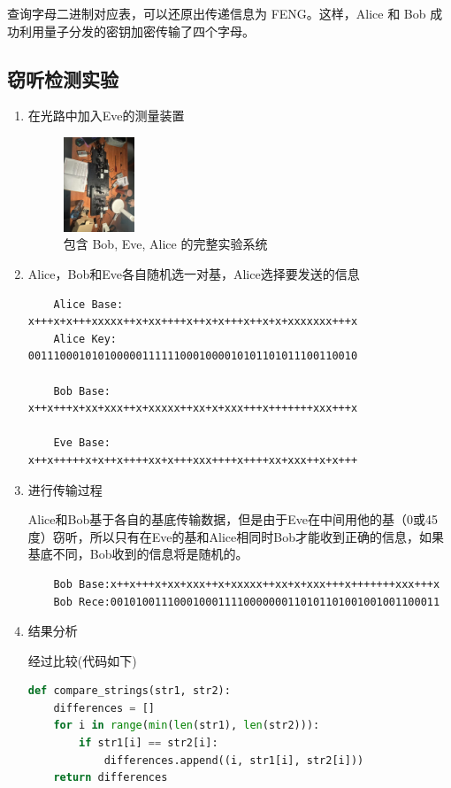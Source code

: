 \documentclass{ctexart}
\begin{document}
查询字母二进制对应表，可以还原出传递信息为 FENG。这样，Alice 和 Bob 成功利用量子分发的密钥加密传输了四个字母。

\subsection{窃听检测实验}
\begin{enumerate}
\item 在光路中加入Eve的测量装置
\begin{figure}[htbp]
    \centering
    \includegraphics[width=0.2\textwidth,height=0.3\textwidth]{pictures/微信图片_20241031162855.jpg}
    \caption{包含 Bob, Eve, Alice 的完整实验系统}
\end{figure}
\item Alice，Bob和Eve各自随机选一对基，Alice选择要发送的信息
\begin{lstlisting}
    Alice Base: x+++x+x+++xxxxx++x+xx++++x++x+x+++x++x+x+xxxxxxx+++x
    Alice Key:  0011100010101000001111110001000010101101011100110010
    
    Bob Base:   x++x+++x+xx+xxx++x+xxxxx++xx+x+xxx+++x+++++++xxx+++x

    Eve Base:   x++x+++++x+x++x++++xx+x+++xxx++++x++++xx+xxx++x+x+++
\end{lstlisting}


\item 进行传输过程

Alice和Bob基于各自的基底传输数据，但是由于Eve在中间用他的基（0或45度）窃听，所以只有在Eve的基和Alice相同时Bob才能收到正确的信息，如果基底不同，Bob收到的信息将是随机的。

\begin{lstlisting}
    Bob Base:x++x+++x+xx+xxx++x+xxxxx++xx+x+xxx+++x+++++++xxx+++x
    Bob Rece:0010100111000100011110000000110101101001001001100011
\end{lstlisting}
\item 结果分析

经过比较(代码如下)
\begin{lstlisting}[language=python]
def compare_strings(str1, str2):
    differences = []
    for i in range(min(len(str1), len(str2))):
        if str1[i] == str2[i]:
            differences.append((i, str1[i], str2[i]))
    return differences


\end{lstlisting}
\end{enumerate}
\end{document}
